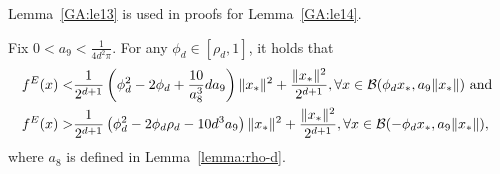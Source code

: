 Lemma~\ref{GA:le13} is used in proofs for Lemma~\ref{GA:le14}.

\begin{lemma} \label{GA:le13}
Fix $0 < a_9 < \frac{1}{4 d^2 \pi}$. For any $\phi_d \in [\rho_d, 1]$, it holds that
\begin{align*}
{f^E}(x) <& \frac{1}{2^{d+1}} \left( \phi_d^2 - 2 \phi_d + \frac{10}{a_8^3} d a_9 \right) \|x_*\|^2 + \frac{\|x_*\|^2}{2^{d+1}}, \forall x \in \mathcal{B}(\phi_d x_*, a_9  \|x_*\|) \hbox{ and } \\
{f^E}(x) >& \frac{1}{2^{d+1}} \left(\phi_d^2 - 2 \phi_d \rho_d - 10 d^3 a_9 \right) \|x_*\|^2 + \frac{\|x_*\|^2}{2^{d+1}}, \forall x \in \mathcal{B}(- \phi_d x_*, a_9  \|x_*\|),
\end{align*}
where $a_8$ is defined in Lemma~\ref{lemma:rho-d}.
\end{lemma}
